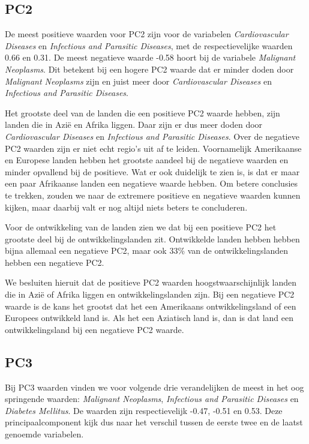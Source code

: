 \documentclass[a4paper,kulak]{kulakarticle}
\begin{document}
\subsection{PC2}
De meest positieve waarden voor PC2 zijn voor de variabelen \textit{Cardiovascular Diseases} en \textit{Infectious and Parasitic Diseases}, met de respectievelijke waarden 0.66 en 0.31. De meest negatieve waarde -0.58 hoort bij de variabele \textit{Malignant Neoplasms}. Dit betekent bij een hogere PC2 waarde dat er minder doden door \textit{Malignant Neoplasms} zijn en juist meer door  \textit{Cardiovascular Diseases} en \textit{Infectious and Parasitic Diseases}. 

Het grootste deel van de landen die een positieve PC2 waarde hebben, zijn landen die in Azi\"e en Afrika liggen. Daar zijn er dus meer doden door \textit{Cardiovascular Diseases} en \textit{Infectious and Parasitic Diseases}. Over de negatieve PC2 waarden zijn er niet echt regio's uit af te leiden. Voornamelijk Amerikaanse en Europese landen hebben het grootste aandeel bij de negatieve waarden en minder opvallend bij de positieve. Wat er ook duidelijk te zien is, is dat er maar een paar Afrikaanse landen een negatieve waarde hebben. Om betere conclusies te trekken, zouden we naar de extremere positieve en negatieve waarden kunnen kijken, maar daarbij valt er nog altijd niets beters te concluderen. 

Voor de ontwikkeling van de landen zien we dat bij een positieve PC2 het grootste deel bij de ontwikkelingslanden zit. Ontwikkelde landen hebben hebben bijna allemaal een negatieve PC2, maar ook 33\% van de ontwikkelingslanden hebben een negatieve PC2. 

We besluiten hieruit dat de positieve PC2 waarden hoogstwaarschijnlijk landen die in Azi\"e of Afrika liggen en ontwikkelingslanden zijn. Bij een negatieve PC2 waarde is de kans het grootst dat het een Amerikaans ontwikkelingsland of een Europees ontwikkeld land is. Als het een Aziatisch land is, dan is dat land een ontwikkelingsland bij een negatieve PC2 waarde.

\subsection{PC3}
Bij PC3 waarden vinden we voor volgende drie verandelijken de meest in het oog springende waarden: \textit{Malignant Neoplasms}, \textit{Infectious and Parasitic Diseases} en \textit{Diabetes Mellitus}. De waarden zijn respectievelijk -0.47, -0.51 en 0.53. Deze principaalcomponent kijk dus naar het verschil tussen de eerste twee en de laatst genoemde variabelen. 
\end{document}
